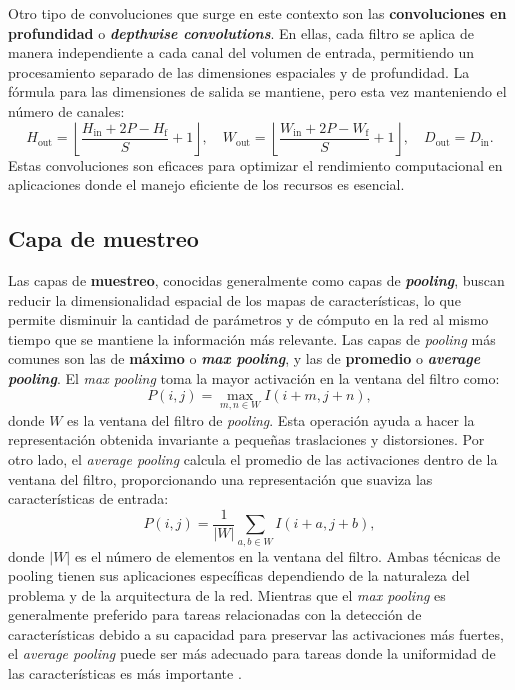 Otro tipo de convoluciones que surge en este contexto son las \textbf{convoluciones en profundidad} o \textbf{\textit{depthwise convolutions}}. En ellas, cada filtro se aplica de manera independiente a cada canal del volumen de entrada, permitiendo un procesamiento separado de las dimensiones espaciales y de profundidad. La fórmula para las dimensiones de salida se mantiene, pero esta vez manteniendo el número de canales:
\[
H_{\text{out}} = \left\lfloor \frac{H_{\text{in}} + 2P - H_{\text{f}}}{S} + 1 \right\rfloor, \quad W_{\text{out}} = \left\lfloor \frac{W_{\text{in}} + 2P - W_{\text{f}}}{S} + 1 \right\rfloor, \quad D_{\text{out}} = D_{\text{in}}.
\]
Estas convoluciones son eficaces para optimizar el rendimiento computacional en aplicaciones donde el manejo eficiente de los recursos es esencial.

\subsection{Capa de muestreo}

Las capas de \textbf{muestreo}, conocidas generalmente como capas de \textbf{\textit{pooling}}, buscan reducir la dimensionalidad espacial de los mapas de características, lo que permite disminuir la cantidad de parámetros y de cómputo en la red al mismo tiempo que se mantiene la información más relevante. Las capas de \textit{pooling} más comunes son las de \textbf{máximo} o \textbf{\textit{max pooling}}, y las de \textbf{promedio} o \textbf{\textit{average pooling}}. El \textit{max pooling} toma la mayor activación en la ventana del filtro como:
\begin{equation}
	P(i, j) = \max_{m, n \in W} I(i+m, j+n),
\end{equation}
donde \(W\) es la ventana del filtro de \textit{pooling}. Esta operación ayuda a hacer la representación obtenida invariante a pequeñas traslaciones y distorsiones. Por otro lado, el \textit{average pooling} calcula el promedio de las activaciones dentro de la ventana del filtro, proporcionando una representación que suaviza las características de entrada:
\begin{equation}
	P(i, j) = \frac{1}{|W|} \sum_{a, b \in W} I(i+a, j+b),
\end{equation}
donde \(|W|\) es el número de elementos en la ventana del filtro. Ambas técnicas de pooling tienen sus aplicaciones específicas dependiendo de la naturaleza del problema y de la arquitectura de la red. Mientras que el \textit{max pooling} es generalmente preferido para tareas relacionadas con la detección de características debido a su capacidad para preservar las activaciones más fuertes, el \textit{average pooling} puede ser más adecuado para tareas donde la uniformidad de las características es más importante \cite{krizhevsky2012imagenet}.

